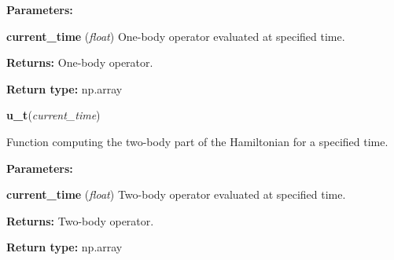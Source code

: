 \begin{tcolorbox}
{\begin{adjustwidth}{4em}{}
        \textbf{Parameters:}

        \hspace{1.5em} \textbf{current\_time} (\emph{float})
            One-body operator evaluated at specified time.

        \textbf{Returns:} One-body operator.

        \textbf{Return type:} np.array
    \end{adjustwidth}

    \hspace{2em} \textbf{u\_t}(\emph{current\_time})
    \begin{adjustwidth}{4em}{}
        Function computing the two-body part of the Hamiltonian for a 
        specified time.

        \textbf{Parameters:}

        \hspace{1.5em} \textbf{current\_time} (\emph{float})
            Two-body operator evaluated at specified time.

        \textbf{Returns:} Two-body operator.

        \textbf{Return type:} np.array
    \end{adjustwidth}

    }
\end{tcolorbox}